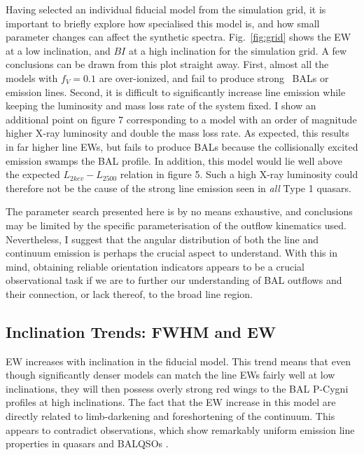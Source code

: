Having selected an individual fiducial model from the simulation grid, it is important
to briefly explore how specialised this model is, and how small parameter
changes can affect the synthetic spectra. Fig.~\ref{fig:grid}
shows the EW at a low inclination, and $BI$ at a high inclination for the simulation
grid. A few conclusions can be drawn from this plot straight away. 
First, almost all the models with 
$f_V=0.1$ are over-ionized, and 
fail to produce strong \civ\ BALs or emission lines. Second,  
it is difficult to significantly increase line emission while
keeping the luminosity and mass loss rate of the system fixed. 
I show an additional point on figure 7 corresponding to a 
model with an order of
magnitude higher X-ray luminosity and double the mass loss rate. As expected, 
this results in far higher line EWs, but fails to produce BALs because
the collisionally excited emission swamps the BAL profile. In addition,
this model would lie well above the expected $L_{2kev}-L_{2500}$ 
relation in figure 5. Such a high X-ray luminosity could therefore 
not be the cause of the strong line emission seen in {\em all} Type 1 quasars.

The parameter search presented here is by no means exhaustive, and
conclusions may be limited by the specific parameterisation of the outflow 
kinematics used. Nevertheless, I suggest that the angular distribution
of both the line and continuum emission is perhaps the crucial 
aspect to understand. With this in mind, obtaining reliable orientation 
indicators appears to be a crucial observational task if we are to
further our understanding of BAL outflows 
and their connection, or lack thereof, to the 
broad line region. 

\subsection{Inclination Trends: FWHM and EW}
\label{sec:ew_in_model}

EW increases with inclination in the fiducial model.
This trend means that even though significantly denser
models can match the line EWs fairly well at low inclinations, they will then
possess overly strong red wings to the BAL P-Cygni profiles at high inclinations.
The fact that the EW increase in this model are directly related to limb-darkening 
and foreshortening of the continuum. 
This appears to contradict observations, which show remarkably uniform emission
line properties in quasars and BALQSOs \citep{weymann1991,dipompeo2012b}. 

